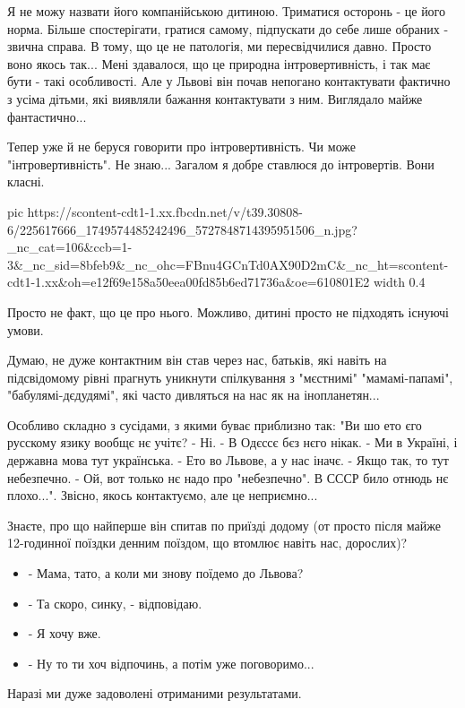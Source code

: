 Я не можу назвати його компанійською дитиною. Триматися осторонь - це його
норма. Більше спостерігати, гратися самому, підпускати до себе лише обраних -
звична справа. В тому, що це не патологія, ми пересвідчилися давно. Просто воно
якось так... Мені здавалося, що це природна інтровертивність, і так має бути -
такі особливості. Але у Львові він почав непогано контактувати фактично з усіма
дітьми, які виявляли бажання контактувати з ним. Виглядало майже фантастично...

Тепер уже й не беруся говорити про інтровертивність. Чи може
"інтровертивність". Не знаю... Загалом я добре ставлюся до інтровертів. Вони
класні. 

\ifcmt
  pic https://scontent-cdt1-1.xx.fbcdn.net/v/t39.30808-6/225617666_1749574485242496_5727848714395951506_n.jpg?_nc_cat=106&ccb=1-3&_nc_sid=8bfeb9&_nc_ohc=FBnu4GCnTd0AX90D2mC&_nc_ht=scontent-cdt1-1.xx&oh=e12f69e158a50eea00fd85b6ed71736a&oe=610801E2
  width 0.4
\fi

Просто не факт, що це про нього. Можливо, дитині просто не підходять існуючі
умови.

Думаю, не дуже контактним він став через нас, батьків, які навіть на
підсвідомому рівні прагнуть уникнути спілкування з "мєстнимі" "мамамі-папамі",
"бабулямі-дєдудямі", які часто дивляться на нас як на інопланетян... 

Особливо складно з сусідами, з якими буває приблизно так: "Ви шо ето єго
русскому язику вообщє нє учітє? - Ні. - В Одєссє бєз нєго нікак. - Ми в
Україні, і державна мова тут українська. - Ето во Львове, а у нас іначє. - Якщо
так, то тут небезпечно. - Ой, вот только нє надо про "небезпечно". В СССР било
отнюдь нє плохо...". Звісно, якось контактуємо, але це  неприємно...

Знаєте, про що найперше він спитав по приїзді додому (от просто після майже
12-годинної поїздки денним поїздом, що втомлює навіть нас, дорослих)?

\begin{itemize}
  \item - Мама, тато, а коли ми знову поїдемо до Львова?
  \item - Та скоро, синку, - відповідаю.
  \item - Я хочу вже.
  \item - Ну то ти хоч відпочинь, а потім уже поговоримо...
\end{itemize}

Наразі ми дуже задоволені отриманими результатами.

